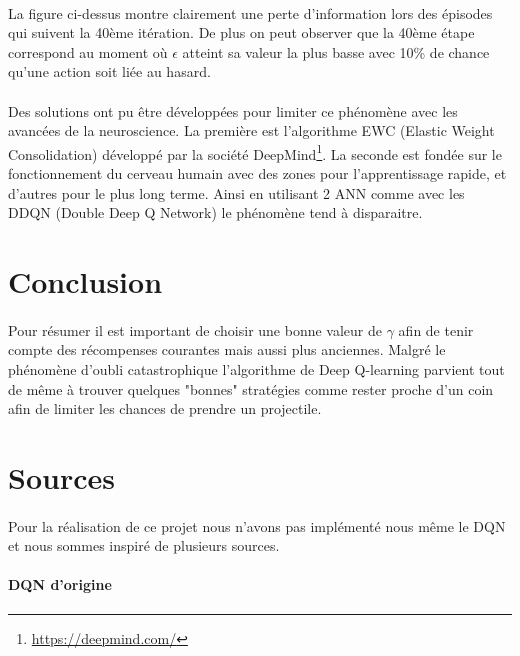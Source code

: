 \documentclass[12pt,oneside,a4paper]{article}
\begin{document}
    \paragraph{}
    La figure ci-dessus montre clairement une perte d'information lors des épisodes qui suivent la 40ème itération.
    De plus on peut observer que la 40ème étape correspond au moment où $\epsilon$ atteint sa valeur la plus basse
    avec 10\% de chance qu'une action soit liée au hasard.

    \paragraph{}
    Des solutions ont pu être développées pour limiter ce phénomène avec les avancées de la neuroscience. La première
    est l'algorithme EWC (Elastic Weight Consolidation) développé par la société DeepMind\footnote{\url{https://deepmind.com/}}.
    La seconde est fondée sur le fonctionnement du cerveau humain avec des zones pour l'apprentissage rapide, et
    d'autres pour le plus long terme. Ainsi en utilisant 2 ANN comme avec les DDQN (Double Deep Q Network)
    le phénomène tend à disparaitre.


    \section{Conclusion}

    \paragraph{}
    Pour résumer il est important de choisir une bonne valeur de $\gamma$ afin de tenir compte des récompenses courantes
    mais aussi plus anciennes. Malgré le phénomène d'oubli catastrophique l'algorithme de Deep Q-learning parvient tout de même
    à trouver quelques "bonnes" stratégies comme rester proche d'un coin afin de limiter les chances de prendre un projectile.


    \newpage
    \section{Sources}
    \paragraph{}
    Pour la réalisation de ce projet nous n'avons pas implémenté nous même le DQN et nous sommes inspiré
    de plusieurs sources.

    \paragraph{DQN d'origine}
\end{document}

